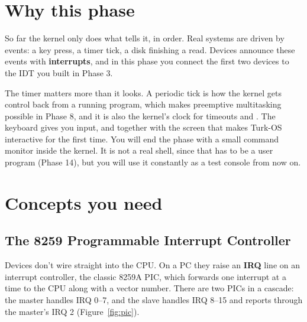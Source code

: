 \documentclass[11pt,a4paper]{article}
\begin{document}


\section{Why this phase}

So far the kernel only does what  tells it, in order. Real systems are driven by events: a key press, a
timer tick, a disk finishing a read. Devices announce these events with \textbf{interrupts}, and in this phase you
connect the first two devices to the IDT you built in Phase 3.

The timer matters more than it looks. A periodic tick is how the kernel gets control back from a running program,
which makes preemptive multitasking possible in Phase 8, and it is also the kernel's clock for timeouts and
. The keyboard gives you input, and together with the screen that makes Turk-OS interactive for the first
time. You will end the phase with a small command monitor inside the kernel. It is not a real shell, since that has
to be a user program (Phase 14), but you will use it constantly as a test console from now on.

\section{Concepts you need}

\subsection{The 8259 Programmable Interrupt Controller}

Devices don't wire straight into the CPU. On a PC they raise an \textbf{IRQ} line on an interrupt controller, the
classic 8259A PIC, which forwards one interrupt at a time to the CPU along with a vector number. There are two PICs in
a cascade: the master handles IRQ 0--7, and the slave handles IRQ 8--15 and reports through the master's IRQ 2
(Figure~\ref{fig:pic}).
\end{document}
